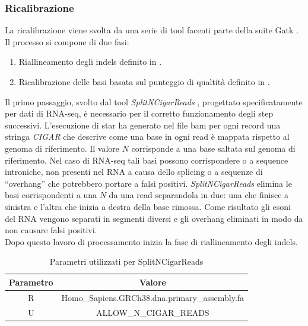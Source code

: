     \subsubsection{Ricalibrazione}
    La ricalibrazione viene svolta da una serie di tool facenti parte della suite Gatk \cite{gatk}.
    Il processo si compone di due fasi:
    \begin{multicols}{2}
      \begin{enumerate}
        \item Riallineamento degli indels definito in \cite{indelrealign}.
        \item Ricalibrazione delle basi basata sul punteggio di qualtit\`a definito in \cite{bqsr}.
      \end{enumerate}
    \end{multicols}
    Il primo passaggio, svolto dal tool \emph{SplitNCigarReads} \cite{splitncigarreads}, progettato specificatamente per dati di RNA-seq, \`e necessario per il corretto funzionamento degli step successivi.
    L'esecuzione di star ha generato nel file bam per ogni record una stringa  \emph{CIGAR} che descrive come una base in ogni read \`e mappata rispetto al genoma di riferimento.
    Il valore $N$ corrisponde a una base saltata sul genoma di riferimento.
    Nel caso di RNA-seq tali basi possono corrispondere o a sequence introniche, non presenti nel RNA a causa dello splicing o a sequenze di ``overhang'' che potrebbero portare a falsi positivi.
    \emph{SplitNCigarReads} elimina le basi corrispondenti a una $N$ da una read separandola in due: una che finisce a sinistra e l'altra che inizia a destra della base rimossa.
    Come risultato gli esoni del RNA vengono separati in segmenti diversi e gli overhang eliminati in modo da non causare falsi positivi.\\
    Dopo questo lavoro di processamento inizia la fase di riallineamento degli indels.
    \begin{table}[H]
        \centering
        \begin{tabular}{|c|c|}
                \hline
                Parametro & Valore\\
                \hline
                R & Homo\_Sapiens.GRCh38.dna.primary\_assembly.fa\\
                \hline
                U & ALLOW\_N\_CIGAR\_READS\\
                \hline
         \end{tabular}
         \caption{Parametri utilizzati per SplitNCigarReads}
    \end{table}
    
